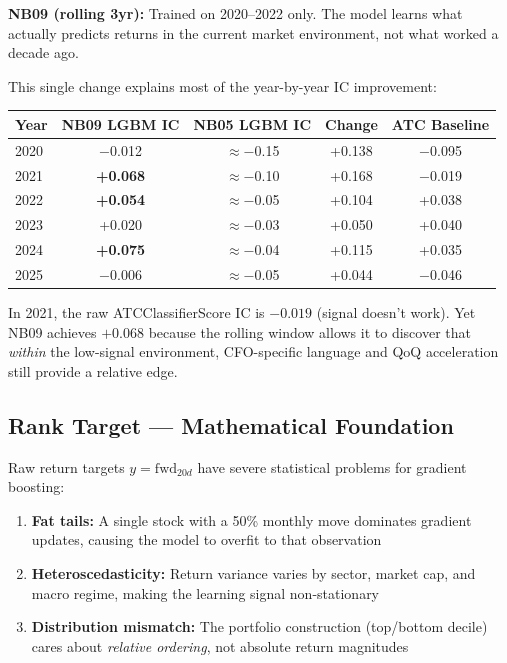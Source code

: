 \documentclass[11pt,a4paper]{article}
\begin{document}
\textbf{NB09 (rolling 3yr):} Trained on 2020--2022 only. The model learns what actually predicts returns in the current market environment, not what worked a decade ago.

This single change explains most of the year-by-year IC improvement:

\begin{center}
\begin{tabular}{lcccc}
\toprule
Year & NB09 LGBM IC & NB05 LGBM IC & Change & ATC Baseline\\
\midrule
2020 & $-$0.012 & $\approx-$0.15 & +0.138 & $-$0.095\\
2021 & \textbf{+0.068} & $\approx-$0.10 & +0.168 & $-$0.019\\
2022 & \textbf{+0.054} & $\approx-$0.05 & +0.104 & +0.038\\
2023 & +0.020 & $\approx-$0.03 & +0.050 & +0.040\\
2024 & \textbf{+0.075} & $\approx-$0.04 & +0.115 & +0.035\\
2025 & $-$0.006 & $\approx-$0.05 & +0.044 & $-$0.046\\
\bottomrule
\end{tabular}
\end{center}

In 2021, the raw ATCClassifierScore IC is $-0.019$ (signal doesn't work). Yet NB09 achieves $+0.068$ because the rolling window allows it to discover that \emph{within} the low-signal environment, CFO-specific language and QoQ acceleration still provide a relative edge.

\subsection{Rank Target --- Mathematical Foundation}

Raw return targets $y = \text{fwd}_{20d}$ have severe statistical problems for gradient boosting:
\begin{enumerate}[nosep]
  \item \textbf{Fat tails:} A single stock with a 50\% monthly move dominates gradient updates, causing the model to overfit to that observation
  \item \textbf{Heteroscedasticity:} Return variance varies by sector, market cap, and macro regime, making the learning signal non-stationary
  \item \textbf{Distribution mismatch:} The portfolio construction (top/bottom decile) cares about \emph{relative ordering}, not absolute return magnitudes
\end{enumerate}
\end{document}
